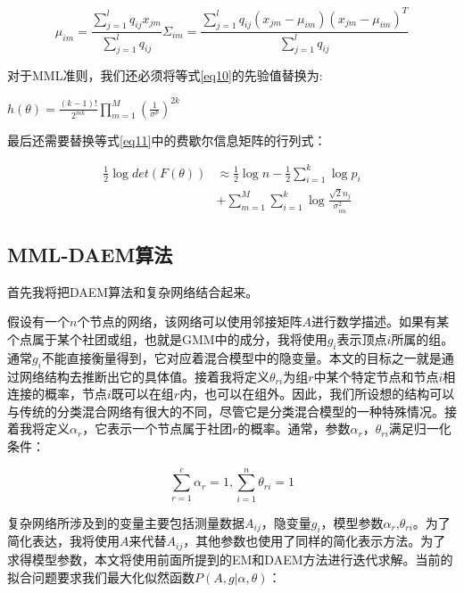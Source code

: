 \documentclass[a4paper,12pt,openany,oneside,utf-8]{ctexbook}
\begin{document}
	\begin{equation}
	    \mu_{im}=\frac{\sum_{j=1}^l q_{ij}x_{j m}}{\sum_{j=1}^l q_{ij}}
	    \Sigma_{i m}=\frac{\sum_{j=1}^l q_{i j}(x_{j m}-\mu_{im})(x_{jm}-\mu_{im})^T}{\sum_{j=1}^l q_{i j}}
	\end{equation}
	
	对于MML准则，我们还必须将等式\ref{eq10}的先验值替换为:
	
	\begin{center}
	   $ h(\theta)=\frac{(k-1)!}{2^{m k}}\prod_{m=1}^{M}(\frac{1}{\sigma^p})^{2k}$
	\end{center}
	
	最后还需要替换等式\ref{eq11}中的费歇尔信息矩阵的行列式：
	
	\begin{equation}
	\begin{aligned}
	    \frac{1}{2}\log det(F(\theta))&\approx\frac{1}{2}\log n-\frac{1}{2}\sum_{i=1}^k\log p_i\\&+\sum_{m=1}^M\sum_{i=1}^k \log\frac{\sqrt2n_j}{\sigma_{i m}^2}
	\end{aligned}
	\end{equation}
	
	\subsection{MML-DAEM算法}
	
	首先我将把DAEM算法和复杂网络结合起来。
	
	假设有一个$n$个节点的网络，该网络可以使用邻接矩阵$A$进行数学描述。如果有某个点属于某个社团或组，也就是GMM中的成分，我将使用$g_i$表示顶点$i$所属的组。通常$g_i$不能直接衡量得到，它对应着混合模型中的隐变量。本文的目标之一就是通过网络结构去推断出它的具体值。接着我将定义$\theta_{r i}$为组$r$中某个特定节点和节点$i$相连接的概率，节点$i$既可以在组$r$内，也可以在组外。因此，我们所设想的结构可以与传统的分类混合网络有很大的不同，尽管它是分类混合模型的一种特殊情况。接着我将定义$\alpha_r$，它表示一个节点属于社团$r$的概率。通常，参数$\alpha_r$，$\theta_{r i}$满足归一化条件：
	
	\begin{equation}
	    \sum_{r=1}^{c}\alpha_r=1,\sum_{i=1}^{n}\theta_{r i}=1
	\end{equation}
	
    复杂网络所涉及到的变量主要包括测量数据$A_{i j}$，隐变量$g_i$，模型参数$\alpha_r$,$\theta_{r i}$。为了简化表达，我将使用$A$来代替$A_{i j}$，其他参数也使用了同样的简化表示方法。为了求得模型参数，本文将使用前面所提到的EM和DAEM方法进行迭代求解。当前的拟合问题要求我们最大化似然函数$P(A,g|\alpha,\theta)$：
    
\end{document}
